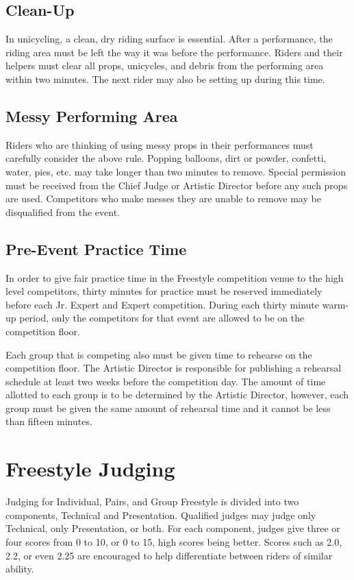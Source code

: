 \section{Clean-Up}
In unicycling, a clean, dry riding surface is essential.
After a performance, the riding area must be left the way it was before the performance.
Riders and their helpers must clear all props, unicycles, and debris from the performing area within two minutes.
The next rider may also be setting up during this time.

\section{Messy Performing Area}
Riders who are thinking of using messy props in their performances must carefully consider the above rule.
Popping balloons, dirt or powder, confetti, water, pies, etc.
may take longer than two minutes to remove.
Special permission must be received from the Chief Judge or Artistic Director before any such props are used.
Competitors who make messes they are unable to remove may be disqualified from the event.

\section{Pre-Event Practice Time}
In order to give fair practice time in the Freestyle competition venue to the high level competitors, thirty minutes for practice must be reserved immediately before each Jr. Expert and Expert competition.
During each thirty minute warm-up period, only the competitors for that event are allowed to be on the competition floor.

Each group that is competing also must be given time to rehearse on the competition floor.
The Artistic Director is responsible for publishing a rehearsal schedule at least two weeks before the competition day.
The amount of time allotted to each group is to be determined by the Artistic Director, however, each group must be given the same amount of rehearsal time and it cannot be less than fifteen minutes.

\chapter{Freestyle Judging}

Judging for Individual, Pairs, and Group Freestyle is divided into two components, Technical and Presentation.
Qualified judges may judge only Technical, only Presentation, or both.
For each component, judges give three or four scores from 0 to 10, or 0 to 15, high scores being better.
Scores such as 2.0, 2.2, or even 2.25 are encouraged to help differentiate between riders of similar ability.

